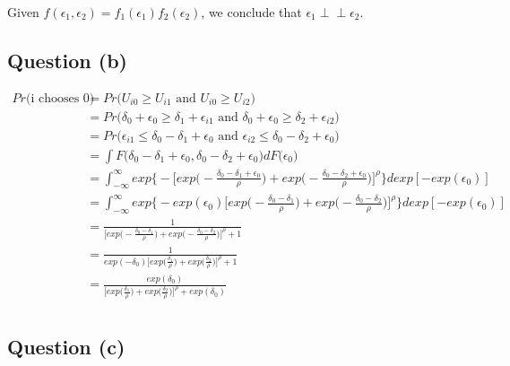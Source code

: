\documentclass{article}
\newcommand{\indep}{\perp \!\!\! \perp}
\begin{document}
Given $f(\epsilon_1, \epsilon_2) = f_1(\epsilon_1) f_2(\epsilon_2)$, we conclude that $\epsilon_1 \indep \epsilon_2 $. 

\subsection*{Question (b)}
\addtolength{\jot}{2pt}
\begin{equation*}
\begin{split}
Pr\bigg(\text{i chooses 0}\bigg) & = Pr\bigg(U_{i0} \geq U_{i1} \text{ and } U_{i0} \geq U_{i2}\bigg) \\
& = Pr\bigg(\delta_0 + \epsilon_0 \geq \delta_1 + \epsilon_{i1} \text{ and } \delta_0 + \epsilon_0 \geq \delta_2 + \epsilon_{i2}\bigg) \\
& = Pr\bigg(\epsilon_{i1} \leq \delta_0 - \delta_1  + \epsilon_0 \text{ and } \epsilon_{i2} \leq \delta_0 - \delta_2 + \epsilon_0 \bigg)\\ 
& = \int F\bigg(\delta_0 - \delta_1  + \epsilon_0, \delta_0 - \delta_2  + \epsilon_0) dF(\epsilon_{0}\bigg) \\
& = \int_{-\infty}^{\infty} exp \bigg \{ - \bigg [exp\bigg(- \frac{ \delta_0 - \delta_1  + \epsilon_0 }{\rho} \bigg) + exp \bigg(- \frac{ \delta_0 - \delta_2 + \epsilon_0 }{\rho} \bigg) \bigg]^{\rho} \bigg \} d exp[-exp(\epsilon_0)] \\
& = \int_{-\infty}^{\infty} exp\bigg\{  -exp(\epsilon_0) \bigg[ exp \big( - \frac{ \delta_0 - \delta_1  }{ \rho } \big) + exp \big( - \frac{ \delta_0 - \delta_2 }{ \rho } \big) \bigg]^{\rho} \bigg\} dexp[-exp(\epsilon_0)]  \\
& = \frac{ 1 }{ \bigg[ exp \big( - \frac{ \delta_0 - \delta_1  }{ \rho } \big) + exp \big( - \frac{ \delta_0 - \delta_2 }{ \rho } \big) \bigg]^{\rho} + 1 }  \\
& = \frac{ 1 }{ exp(-\delta_0) \bigg[ exp \big( \frac{ \delta_1  }{ \rho } \big) + exp \big( \frac{ \delta_2 }{ \rho } \big) \bigg]^{\rho} + 1 }  \\
& = \frac{ exp(\delta_0) }{ \bigg[ exp \big( \frac{ \delta_1  }{ \rho } \big) + exp \big( \frac{ \delta_2 }{ \rho } \big) \bigg]^{\rho} + exp(\delta_0) }  \\
\end{split}
\end{equation*}

\subsection*{Question (c)}
\end{document}
